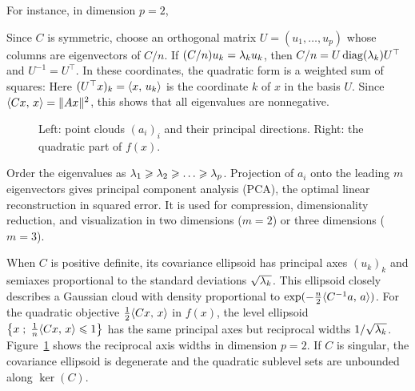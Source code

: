 For instance, in dimension $p=2$, 

Since $C$ is symmetric, choose an orthogonal matrix $U=(u_1,\ldots,u_p)$ whose columns are eigenvectors of $C/n$. If $(C/n)u_k=\lambda_k u_k$, then $C/n=U\operatorname{diag}(\lambda_k)U^\top$ and $U^{-1}=U^\top$. In these coordinates, the quadratic form is a weighted sum of squares:
Here $( U^\top x )_k = \langle x,\,u_k\rangle$ is the coordinate $k$ of $x$ in the basis $U$. Since $\langle Cx,\,x\rangle=\lVert Ax\rVert^2$, this shows that all eigenvalues are nonnegative.

\begin{figure}[tbp]
\centering
{}
\caption{Left: point clouds $(a_i)_i$ and their principal directions. Right: the quadratic part of $f(x)$.}
\label{fig-link-pca}
\end{figure}

Order the eigenvalues as $\lambda_1 \geqslant \lambda_2 \geqslant \ldots \geqslant \lambda_p$. Projection of $a_i$ onto the leading $m$ eigenvectors gives principal component analysis (PCA), the optimal linear reconstruction in squared error. It is used for compression, dimensionality reduction, and visualization in two dimensions ($m=2$) or three dimensions ($m=3$).

When $C$ is positive definite, its covariance ellipsoid has principal axes $(u_k)_k$ and semiaxes proportional to the standard deviations $\sqrt{\lambda_k}$.
%
This ellipsoid closely describes a Gaussian cloud with density proportional to $\exp(-\frac n2\langle C^{-1}a,\,a\rangle)$.
%
For the quadratic objective $\frac{1}{2}\langle Cx,\,x\rangle$ in $f(x)$, the level ellipsoid $\left\{ x \;;\; \frac{1}{n}\langle Cx,\,x\rangle \leqslant 1 \right\}$ has the same principal axes but reciprocal widths $1/\sqrt{\lambda_k}$.
%
Figure~\ref{fig-link-pca} shows the reciprocal axis widths in dimension $p=2$. If $C$ is singular, the covariance ellipsoid is degenerate and the quadratic sublevel sets are unbounded along $\ker(C)$.



